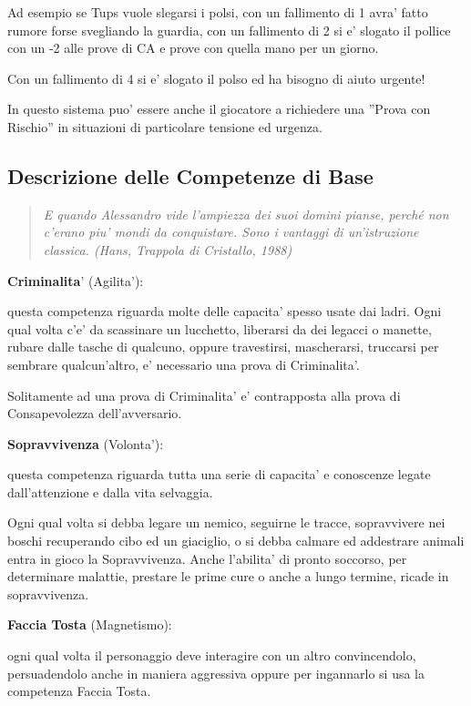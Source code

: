 \documentclass[a4paper,11pt,twoside,openany]{book}
\begin{document}
Ad esempio se Tups vuole slegarsi i polsi, con un fallimento di 1 avra' fatto rumore forse svegliando la guardia, con un fallimento di 2 si e' slogato il pollice con un -2 alle prove di CA e prove con quella mano per un giorno.

Con un fallimento di 4 si e' slogato il polso ed ha bisogno di aiuto urgente!

In questo sistema puo' essere anche il giocatore a richiedere una ''Prova con Rischio'' in situazioni di particolare tensione ed urgenza.

\pagebreak

\subsection{Descrizione delle Competenze di Base}

\label{descrizione-delle-competenze-di-base}
\begin{quote}\textit{
E quando Alessandro vide l'ampiezza dei suoi domini pianse, perché non c'erano piu' mondi da conquistare. Sono i vantaggi di un'istruzione classica. (Hans, Trappola di Cristallo, 1988)
}\end{quote}

\textbf{Criminalita}' (Agilita'):

questa competenza riguarda molte delle capacita' spesso usate dai ladri. Ogni qual volta c'e' da scassinare un lucchetto, liberarsi da dei legacci o manette, rubare dalle tasche di qualcuno, oppure travestirsi, mascherarsi, truccarsi per sembrare qualcun'altro, e' necessario una prova di Criminalita'.

Solitamente ad una prova di Criminalita' e' contrapposta alla prova di Consapevolezza dell'avversario.

\textbf{Sopravvivenza} (Volonta'):

questa competenza riguarda tutta una serie di capacita' e conoscenze legate dall'attenzione e dalla vita selvaggia.

Ogni qual volta si debba legare un nemico, seguirne le tracce, sopravvivere nei boschi recuperando cibo ed un giaciglio, o si debba calmare ed addestrare animali entra in gioco la Sopravvivenza.
Anche l'abilita' di pronto soccorso, per determinare malattie, prestare le prime cure o anche a lungo termine, ricade in sopravvivenza.

\textbf{Faccia Tosta} (Magnetismo):

ogni qual volta il personaggio deve interagire con un altro convincendolo, persuadendolo anche in maniera aggressiva oppure per ingannarlo si usa la competenza Faccia Tosta.
\end{document}
